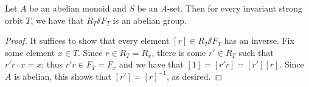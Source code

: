\documentclass[11pt]{amsart}
\renewcommand{\ss}{\mathord{\sslash}}
\begin{document}
\begin{proposition} \label{lem:quotisgp}
    Let $A$ be an abelian monoid and $S$ be an $A$-set. Then for every invariant strong orbit $T$, we have that  $R_T\ss F_T$ is an abelian group. 
\end{proposition}

\begin{proof}
It suffices to show that every element $[r]\in R_T\ss F_T$ has an inverse.
   Fix some element $x\in T$. Since $r\in R_T=R_x$, there is some $r'\in R_T$ such that $r'r\cdot x=x$; thus $r'r\in F_T=F_x$ and we have that $[1]=[r'r]=[r'][r]$. Since $A$ is abelian, this shows that $[r']=[r]^{-1}$, as desired. 
\end{proof}


\end{document}
